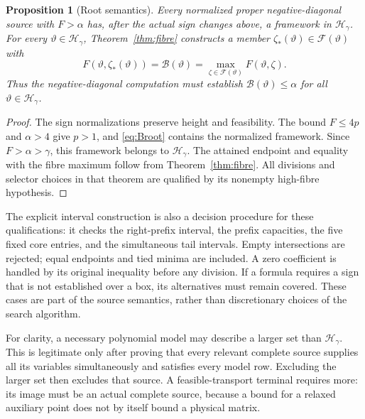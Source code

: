 \documentclass[11pt,reqno]{amsart}
\newtheorem{proposition}[theorem]{Proposition}
\theoremstyle{definition}
\theoremstyle{remark}
\newcommand{\cB}{\mathcal B}
\begin{document}
\begin{proposition}[Root semantics]\label{prop:root-semantics}
Every normalized proper negative-diagonal source with \(F>\alpha\)
has, after the actual sign changes above, a framework in
\(\mathcal H_\gamma\). For every \(\vartheta\in\mathcal H_\gamma\),
Theorem~\ref{thm:fibre} constructs a member
\(\zeta_*(\vartheta)\in\mathcal F(\vartheta)\) with
\[
F(\vartheta,\zeta_*(\vartheta))=\cB(\vartheta)
=\max_{\zeta\in\mathcal F(\vartheta)}F(\vartheta,\zeta).
\]
Thus the negative-diagonal computation must establish
\(\cB(\vartheta)\le\alpha\) for all
\(\vartheta\in\mathcal H_\gamma\).
\end{proposition}
\begin{proof}
The sign normalizations preserve height and feasibility. The bound
\(F\le4p\) and \(\alpha>4\) give \(p>1\), and
\eqref{eq:Broot} contains the normalized framework. Since
\(F>\alpha>\gamma\), this framework belongs to
\(\mathcal H_\gamma\). The attained endpoint and equality with the
fibre maximum follow from Theorem~\ref{thm:fibre}. All divisions and
selector choices in that theorem are qualified by its nonempty
high-fibre hypothesis.
\end{proof}

The explicit interval construction is also a decision procedure for
these qualifications: it checks the right-prefix interval, the prefix
capacities, the five fixed core entries, and the simultaneous tail
intervals. Empty intersections are rejected; equal endpoints and tied
minima are included. A zero coefficient is handled by its original
inequality before any division. If a formula requires a sign that is
not established over a box, its alternatives must remain covered.
These cases are part of the source semantics, rather than discretionary
choices of the search algorithm.

For clarity, a necessary polynomial model may describe a larger set
than \(\mathcal H_\gamma\). This is legitimate only after proving that
every relevant complete source supplies all its variables
simultaneously and satisfies every model row. Excluding the larger set
then excludes that source. A feasible-transport terminal requires more:
its image must be an actual complete source, because a bound for a
relaxed auxiliary point does not by itself bound a physical matrix.
\end{document}
